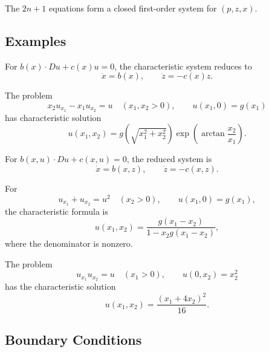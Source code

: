 \begin{remark}
\label{rem:characteristic-ode-closure}
The $2n+1$ equations form a closed first-order system for $(p,z,x)$.
\end{remark}

\subsection{Examples}
\label{sec:characteristics-examples}

For $b(x)\cdot Du+c(x)u=0$, the characteristic system reduces to
\[
\dot x=b(x),\qquad \dot z=-c(x)z.
\]

\begin{example}
\label{ex:linear-pde-quadrant-characteristics}
The problem
\[
x_2u_{x_1}-x_1u_{x_2}=u\quad(x_1,x_2>0),
\qquad u(x_1,0)=g(x_1)
\]
has characteristic solution
\[
u(x_1,x_2)=g\!\left(\sqrt{x_1^2+x_2^2}\right)
\exp\!\left(\arctan\frac{x_2}{x_1}\right).
\]
\end{example}

For $b(x,u)\cdot Du+c(x,u)=0$, the reduced system is
\[
\dot x=b(x,z),\qquad \dot z=-c(x,z).
\]

\begin{example}
\label{ex:semilinear-pde-halfspace-characteristics}
For
\[
u_{x_1}+u_{x_2}=u^2\quad(x_2>0),\qquad u(x_1,0)=g(x_1),
\]
the characteristic formula is
\[
u(x_1,x_2)=\frac{g(x_1-x_2)}{1-x_2g(x_1-x_2)},
\]
where the denominator is nonzero.
\end{example}

\begin{example}
\label{ex:fully-nonlinear-halfspace-characteristics}
The problem
\[
u_{x_1}u_{x_2}=u\quad(x_1>0),\qquad u(0,x_2)=x_2^2
\]
has the characteristic solution
\[
u(x_1,x_2)=\frac{(x_1+4x_2)^2}{16}.
\]
\end{example}

\subsection{Boundary Conditions}
\label{sec:characteristics-boundary-conditions}


